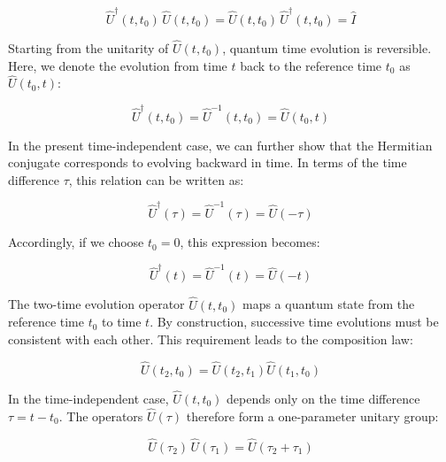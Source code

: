 \begin{equation}
    \hat{U}^\dagger(t,t_0)\,\hat{U}(t,t_0)=\hat{U}(t,t_0)\,\hat{U}^\dagger(t,t_0) = \hat{I}
\label{evolution_unitarity}
\end{equation}

Starting from the unitarity of $\hat{U}(t,t_0)$, quantum time evolution is reversible.
Here, we denote the evolution from time $t$ back to the reference time $t_0$ as $\hat{U}(t_0,t)$:

\begin{equation}
    \hat{U}^{\dagger}(t,t_0)= \hat{U}^{-1}(t,t_0) = \hat{U}(t_0,t)
\label{time_evolution_reversible}
\end{equation}

In the present time-independent case, we can further show that the Hermitian conjugate corresponds to evolving backward in time.
In terms of the time difference $\tau$, this relation can be written as:

\begin{equation}
    \hat{U}^{\dagger}(\tau)= \hat{U}^{-1}(\tau) = \hat{U}(-\tau)
\label{time_evolution_reversible_tau}
\end{equation}

Accordingly, if we choose $t_0=0$, this expression becomes:

\begin{equation}
    \hat{U}^{\dagger}(t)= \hat{U}^{-1}(t)= \hat{U}(-t)
\label{time_evolution_reversible_deg}
\end{equation}

The two-time evolution operator $\hat{U}(t,t_0)$ maps a quantum state from the reference time $t_0$ to time $t$.
By construction, successive time evolutions must be consistent with each other.
This requirement leads to the composition law:

\begin{equation}
    \hat{U}(t_2,t_0)=\hat{U}(t_2,t_1)\hat{U}(t_1,t_0)
\label{composition_law_time_evolution}
\end{equation}

In the time-independent case, $\hat{U}(t,t_0)$ depends only on the time difference $\tau=t-t_0$.
The operators $\hat{U}(\tau)$ therefore form a one-parameter unitary group:

\begin{equation}
    \hat{U}(\tau_2)\,\hat{U}(\tau_1)=\hat{U}(\tau_2+\tau_1)
\label{time_evolution_group_property_tau}
\end{equation}

